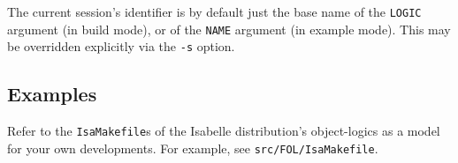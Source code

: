 The current session's identifier is by default just the base name of the
\texttt{LOGIC} argument (in build mode), or of the \texttt{NAME} argument (in
example mode). This may be overridden explicitly via the \texttt{-s} option.


\subsection*{Examples}

Refer to the \texttt{IsaMakefile}s of the Isabelle distribution's
object-logics as a model for your own developments.  For example, see
\texttt{src/FOL/IsaMakefile}.

